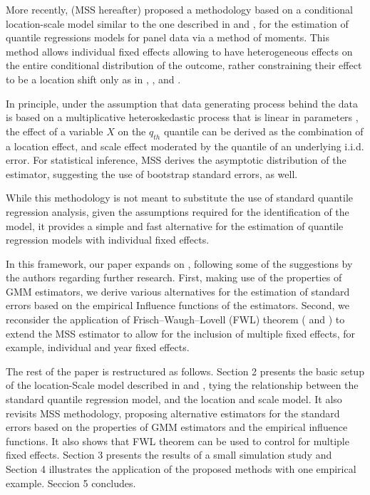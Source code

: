 \documentclass[
  authoryear,
  review,
  1p]{elsarticle}
\begin{document}
More recently, \citet{mss2019} (MSS hereafter) proposed a methodology
based on a conditional location-scale model similar to the one described
in \citet{he1997} and \citet{zhao2000}, for the estimation of quantile
regressions models for panel data via a method of moments. This method
allows individual fixed effects allowing to have heterogeneous effects
on the entire conditional distribution of the outcome, rather
constraining their effect to be a location shift only as in
\citet{canay2011}, \citet{koenker2004}, and \citet{lamarche2010}.

In principle, under the assumption that data generating process behind
the data is based on a multiplicative heteroskedastic process that is
linear in parameters \citep[\citet{mss2019}, \citet{he1997},
\citet{zhao2000}]{cameron2005}, the effect of a variable \(X\) on the
\(q_{th}\) quantile can be derived as the combination of a location
effect, and scale effect moderated by the quantile of an underlying
i.i.d. error. For statistical inference, MSS derives the asymptotic
distribution of the estimator, suggesting the use of bootstrap standard
errors, as well.

While this methodology is not meant to substitute the use of standard
quantile regression analysis, given the assumptions required for the
identification of the model, it provides a simple and fast alternative
for the estimation of quantile regression models with individual fixed
effects.

In this framework, our paper expands on \citet{mss2019}, following some
of the suggestions by the authors regarding further research. First,
making use of the properties of GMM estimators, we derive various
alternatives for the estimation of standard errors based on the
empirical Influence functions of the estimators. Second, we reconsider
the application of Frisch--Waugh--Lovell (FWL) theorem
(\citet{frishwaugh1933} and \citet{lovell1963}) to extend the MSS
estimator to allow for the inclusion of multiple fixed effects, for
example, individual and year fixed effects.

The rest of the paper is restructured as follows. Section 2 presents the
basic setup of the location-Scale model described in \citet{he1997} and
\citet{zhao2000}, tying the relationship between the standard quantile
regression model, and the location and scale model. It also revisits MSS
methodology, proposing alternative estimators for the standard errors
based on the properties of GMM estimators and the empirical influence
functions. It also shows that FWL theorem can be used to control for
multiple fixed effects. Section 3 presents the results of a small
simulation study and Section 4 illustrates the application of the
proposed methods with one empirical example. Seccion 5 concludes.
\end{document}
